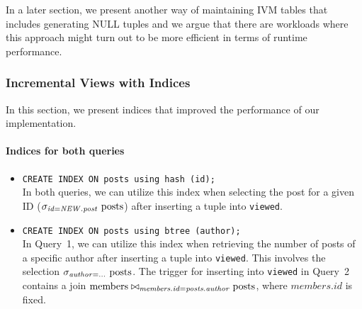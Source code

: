 \documentclass[12pt]{article}
\begin{document}
In a later section, we present another way of maintaining IVM tables that includes generating NULL tuples and we argue that there are workloads where this approach might turn out to be more efficient in terms of runtime performance.

\subsubsection{Incremental Views with Indices}
In this section, we present indices that improved the performance of our implementation.
\newpage
\paragraph{Indices for both queries}
\begin{itemize}
	\item \lstinline{CREATE INDEX ON posts using hash (id);} \\
    In both queries, we can utilize this index when selecting the post for a given ID ($\sigma_{\mathit{id} = \mathit{NEW.post}} \mbox{ \lstinline{posts}}$) after inserting a tuple into \lstinline{viewed}.
    \item \lstinline{CREATE INDEX ON posts using btree (author);} \\
    In Query~1, we can utilize this index when retrieving the number of posts of a specific author after inserting a tuple  into \lstinline{viewed}. This involves the selection $\sigma_{\mathit{author} = \ldots} \mbox{ \lstinline{posts}}$. The trigger for inserting into \lstinline{viewed} in Query~2 contains a join $\mbox{\lstinline{members}} \bowtie_{\mathit{members.id} = \mathit{posts.author}} \mbox{\lstinline{posts}}$, where $\mathit{members.id}$ is fixed.
\end{itemize}
\end{document}
